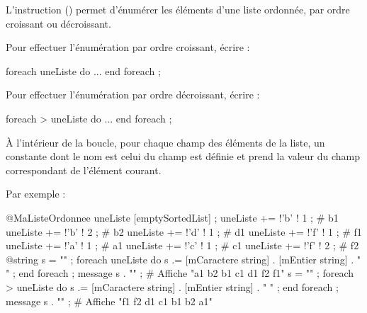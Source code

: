L'instruction  () permet d'énumérer les éléments d'une liste ordonnée, par ordre croissant ou décroissant.

Pour effectuer l'énumération par ordre croissant, écrire :
\begin{galgascode}
foreach uneListe do
  ...
end foreach ;
\end{galgascode}

Pour effectuer l'énumération par ordre décroissant, écrire :
\begin{galgascode}
foreach > uneListe do
  ...
end foreach ;
\end{galgascode}

À l'intérieur de la boucle, pour chaque champ des éléments de la liste, un constante dont le nom est celui du champ est définie et prend la valeur du champ correspondant de l'élément courant.

Par exemple :

\begin{galgascode}
@MaListeOrdonnee uneListe [emptySortedList] ;
uneListe += !'b' ! 1 ; # b1
uneListe += !'b' ! 2 ; # b2
uneListe += !'d' ! 1 ; # d1
uneListe += !'f' ! 1 ; # f1
uneListe += !'a' ! 1 ; # a1
uneListe += !'c' ! 1 ; # c1
uneListe += !'f' ! 2 ; # f2
@string s = "" ;
foreach uneListe do
  s .= [mCaractere string] . [mEntier string] . " " ;
end foreach ;
message s . "\n" ; # Affiche "a1 b2 b1 c1 d1 f2 f1"
s = "" ;
foreach > uneListe do
  s .= [mCaractere string] . [mEntier string] . " " ;
end foreach ;
message s . "\n" ; # Affiche "f1 f2 d1 c1 b1 b2 a1"
\end{galgascode}
